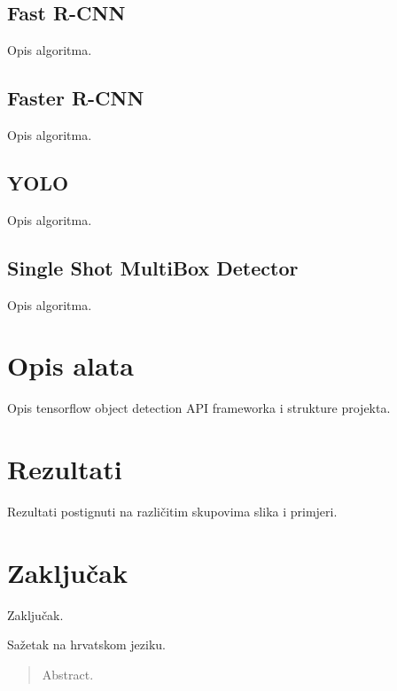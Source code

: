 \documentclass[times, utf8, diplomski]{fer}
\begin{document}
\section{Fast R-CNN}
Opis algoritma.

\section{Faster R-CNN}
Opis algoritma.

\section{YOLO}
Opis algoritma.

\section{Single Shot MultiBox Detector}
Opis algoritma.

\chapter{Opis alata}
Opis tensorflow object detection API frameworka i strukture projekta.

\chapter{Rezultati}
Rezultati postignuti na različitim skupovima slika i primjeri.



\chapter{Zaključak}
Zaključak.





\begin{sazetak}
Sažetak na hrvatskom jeziku.

\end{sazetak}

\begin{abstract}
Abstract.

\end{abstract}
\end{document}
